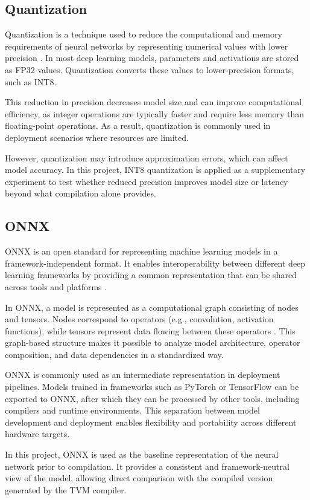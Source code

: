 \documentclass[fleqn,10pt]{olplainarticle}
\begin{document}
\subsection{Quantization}

Quantization is a technique used to reduce the computational and memory requirements of neural networks by representing numerical values with lower precision \cite{jacob2018quantization}. In most deep learning models, parameters and activations are stored as FP32 values. Quantization converts these values to lower-precision formats, such as INT8.

This reduction in precision decreases model size and can improve computational efficiency, as integer operations are typically faster and require less memory than floating-point operations. As a result, quantization is commonly used in deployment scenarios where resources are limited.

However, quantization may introduce approximation errors, which can affect model accuracy. In this project, INT8 quantization is applied as a supplementary experiment to test whether reduced precision improves model size or latency beyond what compilation alone provides.

\subsection{ONNX}
ONNX is an open standard for representing machine learning models in a framework-independent format. It enables interoperability between different deep learning frameworks by providing a common representation that can be shared across tools and platforms \cite{onnx}.

In ONNX, a model is represented as a computational graph consisting of nodes and tensors. Nodes correspond to operators (e.g., convolution, activation functions), while tensors represent data flowing between these operators \cite{onnx}. This graph-based structure makes it possible to analyze model architecture, operator composition, and data dependencies in a standardized way.

ONNX is commonly used as an intermediate representation in deployment pipelines. Models trained in frameworks such as PyTorch or TensorFlow can be exported to ONNX, after which they can be processed by other tools, including compilers and runtime environments. This separation between model development and deployment enables flexibility and portability across different hardware targets.

In this project, ONNX is used as the baseline representation of the neural network prior to compilation. It provides a consistent and framework-neutral view of the model, allowing direct comparison with the compiled version generated by the TVM compiler.
\end{document}
